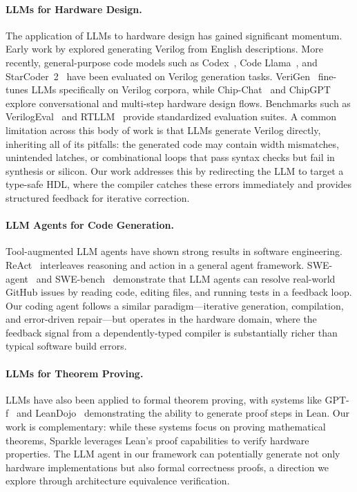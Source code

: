 \paragraph{LLMs for Hardware Design.}
The application of LLMs to hardware design has gained significant momentum. Early work by \citet{pearce2020dave} explored generating Verilog from English descriptions. More recently, general-purpose code models such as Codex~\citep{chen2021codex}, Code Llama~\citep{roziere2023codellama}, and StarCoder~2~\citep{li2024starcoder2} have been evaluated on Verilog generation tasks. VeriGen~\citep{thakur2024verigen} fine-tunes LLMs specifically on Verilog corpora, while Chip-Chat~\citep{blocklove2023chip} and ChipGPT~\citep{chang2024chipgpt} explore conversational and multi-step hardware design flows. Benchmarks such as VerilogEval~\citep{liu2023verilogeval} and RTLLM~\citep{lu2024rtllm} provide standardized evaluation suites. A common limitation across this body of work is that LLMs generate Verilog directly, inheriting all of its pitfalls: the generated code may contain width mismatches, unintended latches, or combinational loops that pass syntax checks but fail in synthesis or silicon. Our work addresses this by redirecting the LLM to target a type-safe HDL, where the compiler catches these errors immediately and provides structured feedback for iterative correction.

\paragraph{LLM Agents for Code Generation.}
Tool-augmented LLM agents have shown strong results in software engineering. ReAct~\citep{yao2023react} interleaves reasoning and action in a general agent framework. SWE-agent~\citep{yang2024swe} and SWE-bench~\citep{jimenez2024swebench} demonstrate that LLM agents can resolve real-world GitHub issues by reading code, editing files, and running tests in a feedback loop. Our coding agent follows a similar paradigm---iterative generation, compilation, and error-driven repair---but operates in the hardware domain, where the feedback signal from a dependently-typed compiler is substantially richer than typical software build errors.

\paragraph{LLMs for Theorem Proving.}
LLMs have also been applied to formal theorem proving, with systems like GPT-f~\citep{polu2020generative} and LeanDojo~\citep{yang2024leandojo} demonstrating the ability to generate proof steps in Lean. Our work is complementary: while these systems focus on proving mathematical theorems, Sparkle leverages Lean's proof capabilities to verify hardware properties. The LLM agent in our framework can potentially generate not only hardware implementations but also formal correctness proofs, a direction we explore through architecture equivalence verification.
